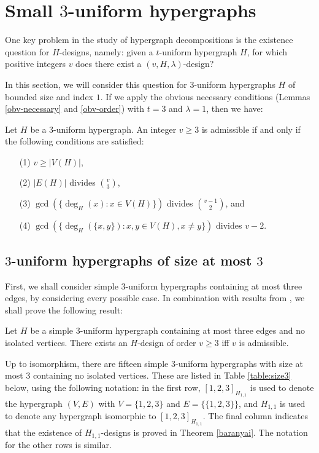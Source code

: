 \section{Small $3$-uniform hypergraphs} \label{section:small-h}

One key problem in the study of hypergraph decompositions is the existence question for
$H$-designs, namely: given a $t$-uniform hypergraph $H$, for which positive
integers $v$ does there exist a $(v, H, \lambda)$-design?

In this section, we will consider this question for $3$-uniform hypergraphs $H$ of bounded size and index $1$.
If we apply the obvious necessary conditions (Lemmas \ref{obv-necessary} and \ref{obv-order}) with $t = 3$ and $\lambda = 1$, then we have:

\begin{lemma} \label{necessary-3-uniform}
Let $H$ be a $3$-uniform hypergraph.
An integer $v \geq 3$ is admissible if and only if the following conditions are satisfied:
\begin{enumerate}
    \item[(1)] $v \geq |V(H)|$,
    \item[(2)] $|E(H)|$ divides ${v \choose 3}$,
    \item[(3)] $\gcd(\{\deg_H(x) : x \in V(H)\})$ divides ${v-1 \choose 2}$, and
    \item[(4)] $\gcd(\{\deg_H(\{x,y\}) : x, y \in V(H), x \neq y\})$ divides $v-2$.
\end{enumerate}
\end{lemma}

\subsection{$3$-uniform hypergraphs of size at most $3$}

First, we shall consider simple $3$-uniform hypergraphs containing at most three edges, by considering every possible case.
In combination with results from \cite{baran, bryant, feng-chang2, hanani}, we shall prove the following result:

\begin{theorem} \label{thm:size-le3}
Let $H$ be a simple $3$-uniform hypergraph containing at most three edges and no isolated vertices.
There exists an $H$-design of order $v \geq 3$ iff $v$ is admissible.
\end{theorem}

Up to isomorphism, there are fifteen simple $3$-uniform hypergraphs with size at most 3 containing no isolated vertices.
These are listed in Table \ref{table:size3} below, using the following notation: in the first row, $[1, 2, 3]_{H_{1,1}}$ is used to denote the hypergraph $(V, E)$ with $V = \{1, 2, 3\}$ and $E = \{\{1, 2, 3\}\}$, and $H_{1,1}$ is used to denote any hypergraph isomorphic to $[1, 2, 3]_{H_{1,1}}$.
The final column indicates that the existence of $H_{1,1}$-designs is proved in Theorem \ref{baranyai}.
The notation for the other rows is similar.

